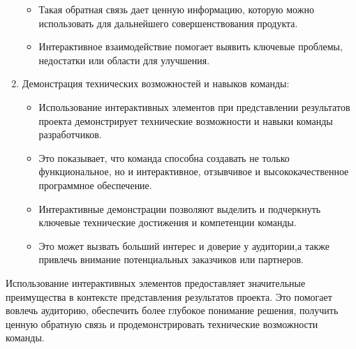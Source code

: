 \begin{enumerate}
\begin{itemize}
                \item Такая обратная связь дает ценную информацию, которую можно использовать для дальнейшего совершенствования продукта.
                \item Интерактивное взаимодействие помогает выявить ключевые проблемы, недостатки или области для улучшения.
            \end{itemize}
            \item Демонстрация технических возможностей и навыков команды:
            \begin{itemize}
                \item Использование интерактивных элементов при представлении результатов проекта демонстрирует технические возможности и навыки команды разработчиков.
                \item Это показывает, что команда способна создавать не только функциональное, но и интерактивное, отзывчивое и высококачественное программное обеспечение.
                \item Интерактивные демонстрации позволяют выделить и подчеркнуть ключевые технические достижения и компетенции команды.
                \item Это может вызвать больший интерес и доверие у аудитории,а также привлечь внимание потенциальных заказчиков или партнеров.
            \end{itemize}
    \end{enumerate}

    Использование интерактивных элементов предоставляет значительные преимущества в контексте представления результатов проекта. Это помогает вовлечь аудиторию, обеспечить более глубокое понимание решения, получить ценную обратную связь и продемонстрировать технические возможности команды.
    
